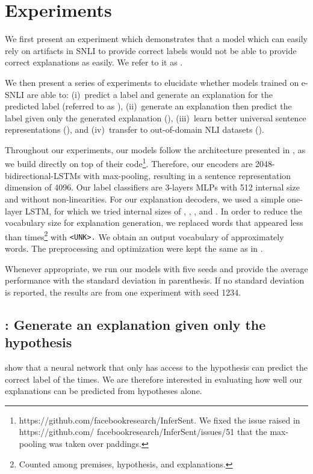 \section{Experiments}
We first present an experiment which demonstrates that a model which can easily rely on artifacts in SNLI to provide correct labels would not be able to provide correct explanations as easily. We refer to it as \expzero.

We then present a series of experiments to elucidate whether models trained on e-SNLI are able to: (i)~predict a label and generate an explanation for the predicted label (referred to as \expone), (ii)~generate an explanation then predict the label given only the generated explanation (\exptwo), (iii)~learn better universal sentence representations (\expthree), and  (iv)~transfer to out-of-domain NLI datasets (\expfour).

Throughout our experiments, our models follow the architecture presented in \citet{infersent}, as we build directly on top of their code\footnote{https://github.com/facebookresearch/InferSent. We fixed the issue raised in https://github.com/ facebookresearch/InferSent/issues/51 that the max-pooling was taken over paddings.}. Therefore, our encoders are 2048-bidirectional-LSTMs \cite{lstm} with max-pooling, resulting in a sentence representation dimension of 4096. Our label classifiers are 3-layers MLPs with 512 internal size and without non-linearities. For our explanation decoders, we used a simple one-layer LSTM, for which we tried internal sizes of , , , and .
In order to reduce the vocabulary size for explanation generation, we replaced words that appeared less than  times\footnote{Counted among premises, hypothesis, and explanations.} with {\tt <UNK>.}
We obtain an output vocabulary of approximately  words. 
The preprocessing and optimization were kept the same as in \cite{infersent}. 

Whenever appropriate, we run our models with five seeds and provide the average performance with the standard deviation in parenthesis. If no standard deviation is reported, the results are from one experiment with seed 1234. 

\subsection{\expzero: Generate an explanation given only the hypothesis}
\label{expzero}

\citet{artifacts} show that a neural network that only has access to the hypothesis can predict the correct label  of the times. We are therefore interested in evaluating how well our explanations can be predicted from hypotheses alone.


